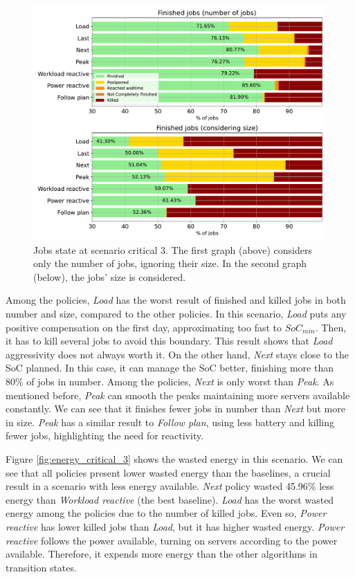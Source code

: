\begin{figure}[!htb]
    \centering
    \includegraphics[scale=0.55]{Images/Compensations/jobs_critical_3.pdf}
    \caption{Jobs state at scenario critical 3. The first graph (above) considers only the number of jobs, ignoring their size. In the second graph (below), the jobs' size is considered.}
    \label{fig:jobs_critical_3}
\end{figure}

Among the policies, \emph{Load} has the worst result of finished and killed jobs in both number and size, compared to the other policies. In this scenario, \emph{Load} puts any positive compensation on the first day, approximating too fast to $SoC_{min}$. Then, it has to kill several jobs to avoid this boundary. This result shows that \emph{Load} aggressivity does not always worth it. On the other hand, \emph{Next} stays close to the SoC planned. In this case, it can manage the SoC better, finishing more than 80\% of jobs in number. Among the policies, \emph{Next} is only worst than \emph{Peak}. As mentioned before, \emph{Peak} can smooth the peaks maintaining more servers available constantly. We can see that it finishes fewer jobs in number than \emph{Next} but more in size. \emph{Peak} has a similar result to \emph{Follow plan}, using less battery and killing fewer jobs, highlighting the need for reactivity.

Figure \ref{fig:energy_critical_3} shows the wasted energy in this scenario. We can see that all policies present lower wasted energy than the baselines, a crucial result in a scenario with less energy available. \emph{Next} policy wasted 45.96\% less energy than \emph{Workload reactive} (the best baseline). \emph{Load} has the worst wasted energy among the policies due to the number of killed jobs. Even so, \emph{Power reactive} has lower killed jobs than \emph{Load}, but it has higher wasted energy. \emph{Power reactive} follows the power available, turning on servers according to the power available. Therefore, it expends more energy than the other algorithms in transition states.

